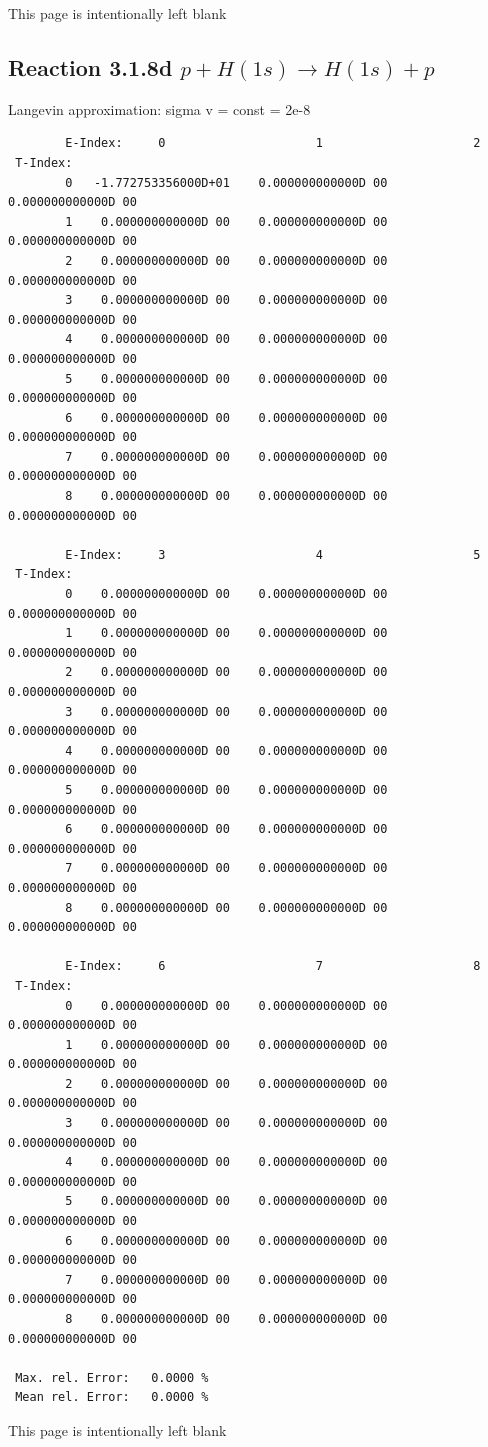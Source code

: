 \documentclass[12pt,dvips]{article}
\begin{document}
\newpage
This page is intentionally left blank
\newpage


\subsection{
Reaction 3.1.8d $ p + H(1s) \rightarrow H(1s) + p   $
}

 Langevin approximation: sigma v = const = 2e-8


\begin{small}\begin{verbatim}
        E-Index:     0                     1                     2
 T-Index:
        0   -1.772753356000D+01    0.000000000000D 00    0.000000000000D 00
        1    0.000000000000D 00    0.000000000000D 00    0.000000000000D 00
        2    0.000000000000D 00    0.000000000000D 00    0.000000000000D 00
        3    0.000000000000D 00    0.000000000000D 00    0.000000000000D 00
        4    0.000000000000D 00    0.000000000000D 00    0.000000000000D 00
        5    0.000000000000D 00    0.000000000000D 00    0.000000000000D 00
        6    0.000000000000D 00    0.000000000000D 00    0.000000000000D 00
        7    0.000000000000D 00    0.000000000000D 00    0.000000000000D 00
        8    0.000000000000D 00    0.000000000000D 00    0.000000000000D 00

        E-Index:     3                     4                     5
 T-Index:
        0    0.000000000000D 00    0.000000000000D 00    0.000000000000D 00
        1    0.000000000000D 00    0.000000000000D 00    0.000000000000D 00
        2    0.000000000000D 00    0.000000000000D 00    0.000000000000D 00
        3    0.000000000000D 00    0.000000000000D 00    0.000000000000D 00
        4    0.000000000000D 00    0.000000000000D 00    0.000000000000D 00
        5    0.000000000000D 00    0.000000000000D 00    0.000000000000D 00
        6    0.000000000000D 00    0.000000000000D 00    0.000000000000D 00
        7    0.000000000000D 00    0.000000000000D 00    0.000000000000D 00
        8    0.000000000000D 00    0.000000000000D 00    0.000000000000D 00

        E-Index:     6                     7                     8
 T-Index:
        0    0.000000000000D 00    0.000000000000D 00    0.000000000000D 00
        1    0.000000000000D 00    0.000000000000D 00    0.000000000000D 00
        2    0.000000000000D 00    0.000000000000D 00    0.000000000000D 00
        3    0.000000000000D 00    0.000000000000D 00    0.000000000000D 00
        4    0.000000000000D 00    0.000000000000D 00    0.000000000000D 00
        5    0.000000000000D 00    0.000000000000D 00    0.000000000000D 00
        6    0.000000000000D 00    0.000000000000D 00    0.000000000000D 00
        7    0.000000000000D 00    0.000000000000D 00    0.000000000000D 00
        8    0.000000000000D 00    0.000000000000D 00    0.000000000000D 00

 Max. rel. Error:   0.0000 %
 Mean rel. Error:   0.0000 %

\end{verbatim}\end{small}
\newpage
This page is intentionally left blank
\newpage
\end{document}

